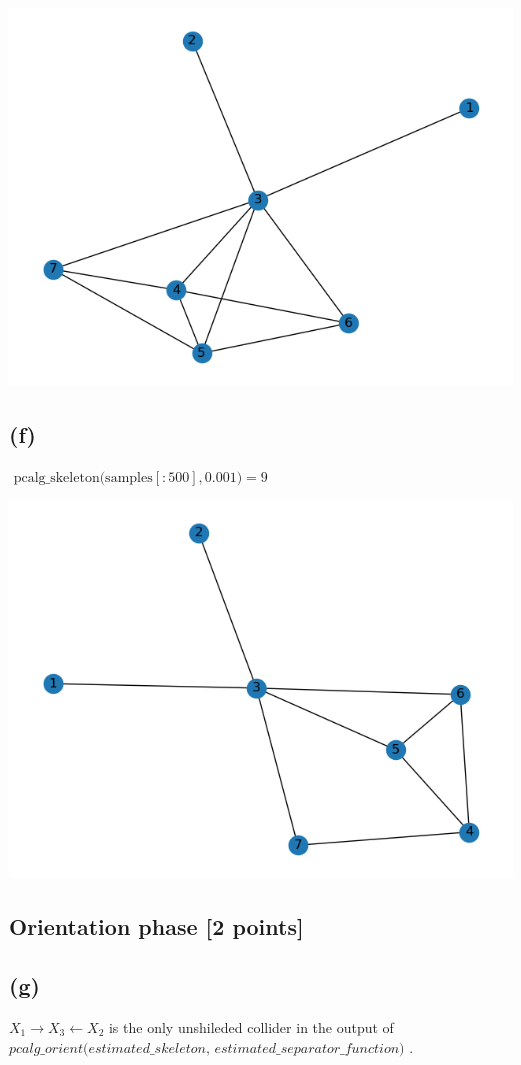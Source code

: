 \documentclass[10pt]{article}
\begin{document}
\includegraphics{images/skel_0.2.png}

\subsection*{(f)}
$\text { pcalg\_skeleton(samples}[: 500], 0.001) = 9$

\includegraphics{images/skel_0.001.png}

\subsection{Orientation phase [2 points]}
\subsection*{(g)}
$X_1 \rightarrow X_3 \leftarrow X_2$ is the only unshileded collider in the output of $\textit{pcalg\_orient(estimated\_skeleton, estimated\_separator\_function) }$. 
\end{document}
